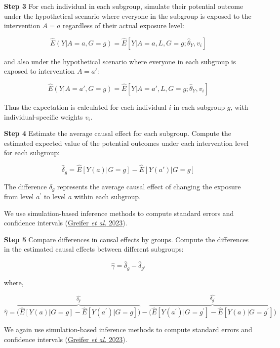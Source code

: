 \documentclass[
  singlecolumn]{article}
\begin{document}
\textbf{Step 3} For each individual in each subgroup, simulate their
potential outcome under the hypothetical scenario where everyone in the
subgroup is exposed to the intervention \(A=a\) regardless of their
actual exposure level:

\[\hat{E}(Y|A=a, G=g)  = \hat{E}[Y|A=a,L,G=g; \hat{\theta}_Y,  v_i]\]

and also under the hypothetical scenario where everyone in each subgroup
is exposed to intervention \(A=a'\):

\[\hat{E}(Y|A=a', G=g)  = \hat{E}[Y|A=a',L,G=g; \hat{\theta}_Y,  v_i]\]

Thus the expectation is calculated for each individual \(i\) in each
subgroup \(g\), with individual-specific weights \(v_i\).

\textbf{Step 4} Estimate the average causal effect for each subgroup.
Compute the estimated expected value of the potential outcomes under
each intervention level for each subgroup:

\[\hat{\delta}_g = \hat{E}[Y(a)|G=g] - \hat{E}[Y(a')|G=g]\]

The difference \(\delta_g\) represents the average causal effect of
changing the exposure from level \(a^{\prime}\) to level \(a\) within
each subgroup.

We use simulation-based inference methods to compute standard errors and
confidence intervals (\protect\hyperlink{ref-greifer2023}{Greifer
\emph{et al.} 2023}).

\textbf{Step 5} Compare differences in causal effects by groups. Compute
the differences in the estimated causal effects between different
subgroups:

\[\hat{\gamma} = \hat{\delta}_g - \hat{\delta}_{g'}\]

where,

\[\hat{\gamma} = \overbrace{\big( \hat{E}[Y(a)|G=g] - \hat{E}[Y(a^{\prime})|G=g] \big)}^{\hat{\delta_g}} - \overbrace{\big(\hat{E}[Y(a^{\prime})|G=g^{\prime}]- \hat{E}[Y(a)|G=g^{\prime}]\big)}^{\hat{\delta_{g^{\prime}}}}\]

We again use simulation-based inference methods to compute standard
errors and confidence intervals
(\protect\hyperlink{ref-greifer2023}{Greifer \emph{et al.} 2023}).
\end{document}
